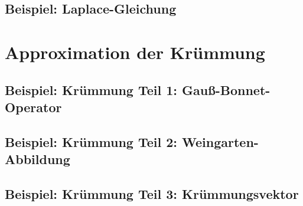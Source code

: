   \subsection{Beispiel: Laplace-Gleichung}

\section{Approximation der Krümmung}
  \subsection{Beispiel: Krümmung Teil 1: Gauß-Bonnet-Operator}
  \subsection{Beispiel: Krümmung Teil 2: Weingarten-Abbildung}
  \subsection{Beispiel: Krümmung Teil 3: Krümmungsvektor}
  \label{subsecKruemmungsvektor}


